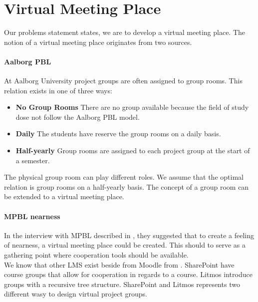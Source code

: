 \section{Virtual Meeting Place}
\label{sec:virtualMeetingPlace}



Our problems statement states, we are to develop a virtual meeting place. 
The notion of a virtual meeting place originates from two sources.

\paragraph{Aalborg PBL} 
At Aalborg University project groups are often assigned to group rooms. This relation exists in one of three ways:
\begin{itemize}
	\item \textbf{No Group Rooms} There are no group available because the field of study dose not follow the Aalborg PBL model.
	\item \textbf{Daily} The students have reserve the group rooms on a daily basis.
	\item \textbf{Half-yearly} Group rooms are assigned to each project group at the start of a semester.
\end{itemize} 
The physical group room can play different roles. We assume that the optimal relation is group rooms on a half-yearly basis.
The concept of a group room can be extended to a virtual meeting place.    

\paragraph{MPBL nearness}
In the interview with MPBL described in \secref{}, they suggested that to create a feeling of nearness, a virtual meeting place could be created. This should to serve as a gathering point where cooperation tools should be available. \\


We know that other LMS exist beside from Moodle from \secref{}. 
SharePoint have course groups that allow for cooperation in regards to a course. Litmos introduce groups with a recursive tree structure. SharePoint and Litmos represents two different wasy to design virtual project groups. \\
 




